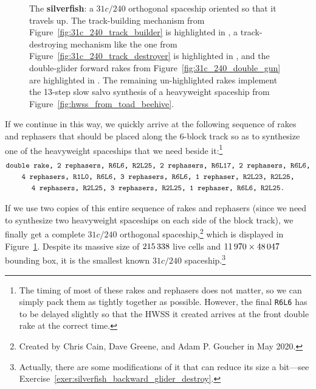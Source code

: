 \begin{figure}[!htbp]
	\centering
	\caption{The \textbf{silverfish}: a $31c/240$ orthogonal spaceship oriented so that it travels up. The track-building mechanism from Figure~\ref{fig:31c_240_track_builder} is highlighted in , a track-destroying mechanism like the one from Figure~\ref{fig:31c_240_track_destroyer} is highlighted in , and the double-glider forward rakes from Figure~\ref{fig:31c_240_double_gun} are highlighted in . The remaining un-highlighted rakes implement the 13-step slow salvo synthesis of a heavyweight spaceship from Figure~\ref{fig:hwss_from_toad_beehive}.}\label{fig:silverfish}
\end{figure}

If we continue in this way, we quickly arrive at the following sequence of rakes and rephasers that should be placed along the $6$-block track so as to synthesize one of the heavyweight spaceships that we need beside it:\footnote{The timing of most of these rakes and rephasers does not matter, so we can simply pack them as tightly together as possible. However, the final \texttt{R6L6} has to be delayed slightly so that the HWSS it created arrives at the front double rake at the correct time.}\label{page:silverfish_rake_seq}
\begin{gather*}
	\text{\texttt{double rake, 2 rephasers, R6L6, R2L25, 2 rephasers, R6L17, 2 rephasers, R6L6,}} \\
	\text{\texttt{4 rephasers, R1L0, R6L6, 3 rephasers, R6L6, 1 rephaser, R2L23, R2L25,}} \\
	\text{\texttt{4 rephasers, R2L25, 3 rephasers, R2L25, 1 rephaser, R6L6, R2L25.}}
\end{gather*}

If we use two copies of this entire sequence of rakes and rephasers (since we need to synthesize two heavyweight spaceships on each side of the block track), we finally get a complete $31c/240$ orthogonal spaceship,\footnote{Created by Chris Cain, Dave Greene, and Adam P. Goucher in May 2020.} which is displayed in Figure~\ref{fig:silverfish}. Despite its massive size of $215{\,}338$ live cells and $11{\,}970 \times 48{\,}047$ bounding box, it is the smallest known $31c/240$ spaceship.\footnote{Actually, there are some modifications of it that can reduce its size a bit---see Exercise~\ref{exer:silverfish_backward_glider_destroy}.}


